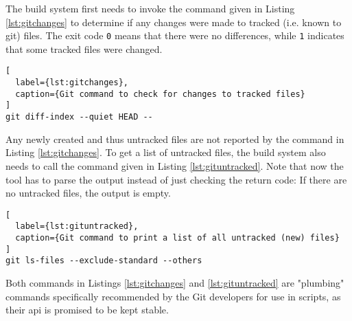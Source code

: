 The build system first needs to invoke the command given in Listing \ref{lst:gitchanges} to determine if any changes were made to tracked (i.e. known to git) files. The exit code \lstinline|0| means that there were no differences, while \lstinline|1| indicates that some tracked files were changed.

\begin{lstlisting}[
  label={lst:gitchanges},
  caption={Git command to check for changes to tracked files}
]
git diff-index --quiet HEAD --
\end{lstlisting}

Any newly created and thus untracked files are not reported by the command in Listing \ref{lst:gitchanges}. To get a list of untracked files, the build system also needs to call the command given in Listing \ref{lst:gituntracked}. Note that now the tool has to parse the output instead of just checking the return code: If there are no untracked files, the output is empty.

\begin{lstlisting}[
  label={lst:gituntracked},
  caption={Git command to print a list of all untracked (new) files}
]
git ls-files --exclude-standard --others
\end{lstlisting}

Both commands in Listings \ref{lst:gitchanges} and \ref{lst:gituntracked} are "plumbing" commands specifically recommended by the Git developers for use in scripts, as their \acrshort{api} is promised to be kept stable.\cite{man:git}
